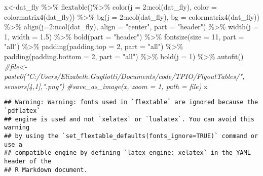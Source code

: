 \documentclass[
]{article}
\newenvironment{Shaded}{\begin{snugshade}}{\end{snugshade}}
\newcommand{\AttributeTok}[1]{\textcolor[rgb]{0.77,0.63,0.00}{#1}}
\newcommand{\CommentTok}[1]{\textcolor[rgb]{0.56,0.35,0.01}{\textit{#1}}}
\newcommand{\DecValTok}[1]{\textcolor[rgb]{0.00,0.00,0.81}{#1}}
\newcommand{\FloatTok}[1]{\textcolor[rgb]{0.00,0.00,0.81}{#1}}
\newcommand{\FunctionTok}[1]{\textcolor[rgb]{0.00,0.00,0.00}{#1}}
\newcommand{\NormalTok}[1]{#1}
\newcommand{\OtherTok}[1]{\textcolor[rgb]{0.56,0.35,0.01}{#1}}
\newcommand{\SpecialCharTok}[1]{\textcolor[rgb]{0.00,0.00,0.00}{#1}}
\newcommand{\StringTok}[1]{\textcolor[rgb]{0.31,0.60,0.02}{#1}}
\begin{document}
\begin{Shaded}
\begin{Highlighting}[]
\NormalTok{x}\OtherTok{\textless{}{-}}\NormalTok{dat\_fly }\SpecialCharTok{\%\textgreater{}\%}
    \FunctionTok{flextable}\NormalTok{()}\SpecialCharTok{\%\textgreater{}\%}
    \FunctionTok{color}\NormalTok{(}\AttributeTok{j =} \DecValTok{2}\SpecialCharTok{:}\FunctionTok{ncol}\NormalTok{(dat\_fly), }\AttributeTok{color =} \FunctionTok{colormatrix4}\NormalTok{(dat\_fly)) }\SpecialCharTok{\%\textgreater{}\%}
    \FunctionTok{bg}\NormalTok{(}\AttributeTok{j =} \DecValTok{2}\SpecialCharTok{:}\FunctionTok{ncol}\NormalTok{(dat\_fly), }\AttributeTok{bg =} \FunctionTok{colormatrix4}\NormalTok{(dat\_fly)) }\SpecialCharTok{\%\textgreater{}\%}
    \FunctionTok{align}\NormalTok{(}\AttributeTok{j=}\DecValTok{2}\SpecialCharTok{:}\FunctionTok{ncol}\NormalTok{(dat\_fly), }\AttributeTok{align =} \StringTok{"center"}\NormalTok{, }\AttributeTok{part =} \StringTok{"header"}\NormalTok{) }\SpecialCharTok{\%\textgreater{}\%}
    \FunctionTok{width}\NormalTok{(}\AttributeTok{j =} \DecValTok{1}\NormalTok{, }\AttributeTok{width =} \FloatTok{1.5}\NormalTok{) }\SpecialCharTok{\%\textgreater{}\%}
    \FunctionTok{bold}\NormalTok{(}\AttributeTok{part =} \StringTok{"header"}\NormalTok{) }\SpecialCharTok{\%\textgreater{}\%}
    \FunctionTok{fontsize}\NormalTok{(}\AttributeTok{size =} \DecValTok{11}\NormalTok{, }\AttributeTok{part =} \StringTok{"all"}\NormalTok{) }\SpecialCharTok{\%\textgreater{}\%}
    \FunctionTok{padding}\NormalTok{(}\AttributeTok{padding.top =} \DecValTok{2}\NormalTok{, }\AttributeTok{part =} \StringTok{"all"}\NormalTok{) }\SpecialCharTok{\%\textgreater{}\%}
    \FunctionTok{padding}\NormalTok{(}\AttributeTok{padding.bottom =} \DecValTok{2}\NormalTok{, }\AttributeTok{part =} \StringTok{"all"}\NormalTok{) }\SpecialCharTok{\%\textgreater{}\%}
    \FunctionTok{bold}\NormalTok{(}\AttributeTok{j =} \DecValTok{1}\NormalTok{) }\SpecialCharTok{\%\textgreater{}\%} \FunctionTok{autofit}\NormalTok{()}
\CommentTok{\#file\textless{}{-}paste0("C:/Users/Elizabeth.Gugliotti/Documents/code/TPIO/FlyoutTables/", sensors[4,1],".png")}
\CommentTok{\#save\_as\_image(x, zoom = 1, path = file)}
\NormalTok{x}
\end{Highlighting}
\end{Shaded}

\begin{verbatim}
## Warning: Warning: fonts used in `flextable` are ignored because the `pdflatex`
## engine is used and not `xelatex` or `lualatex`. You can avoid this warning
## by using the `set_flextable_defaults(fonts_ignore=TRUE)` command or use a
## compatible engine by defining `latex_engine: xelatex` in the YAML header of the
## R Markdown document.
\end{verbatim}
\end{document}
